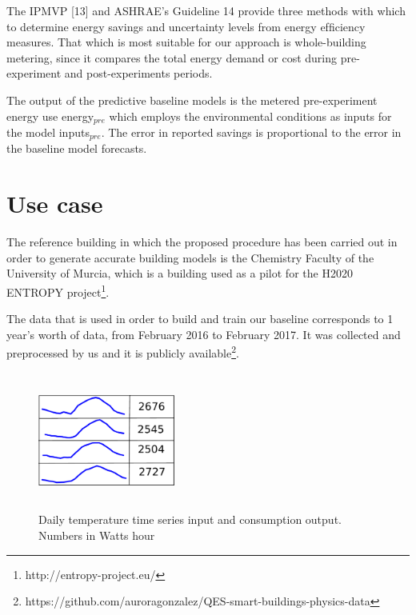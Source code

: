 \documentclass[10pt, conference, compsocconf]{IEEEtran}
\begin{document}
The IPMVP [13] and ASHRAE’s Guideline 14 \cite{ashrae2002ashrae} provide three methods with which to determine energy savings and uncertainty levels from energy efﬁciency measures. That which is most suitable for our approach is whole-building metering, since it compares the total energy demand or cost during pre-experiment and post-experiments periods.


The output of the predictive baseline models is the metered pre-experiment energy use energy$_{pre}$ which employs the environmental conditions as inputs for the model inputs$_{pre}$. The error in reported savings is proportional to the error in the baseline model forecasts.


\section{Use case}

The reference building in which the proposed procedure has been carried out in order to generate accurate building models is the Chemistry Faculty of the University of Murcia, which is a building used as a pilot for the H2020 ENTROPY project\footnote{http://entropy-project.eu/}.

The data that is used in order to build and train our baseline corresponds to 1 year's worth of data, from February 2016 to February 2017. It was collected and preprocessed by us and it is publicly available\footnote{https://github.com/auroragonzalez/QES-smart-buildings-physics-data}.

\begin{figure}[h]%
\centering
\centerline{\includegraphics[width=4.5cm,height=4.5cm,keepaspectratio]{./pics/table_inputs_outputs.pdf}}
\caption{Daily temperature time series input and consumption output. Numbers in Watts hour}\vspace*{-6pt}
  \label{fig:inout}
\end{figure}
\end{document}
